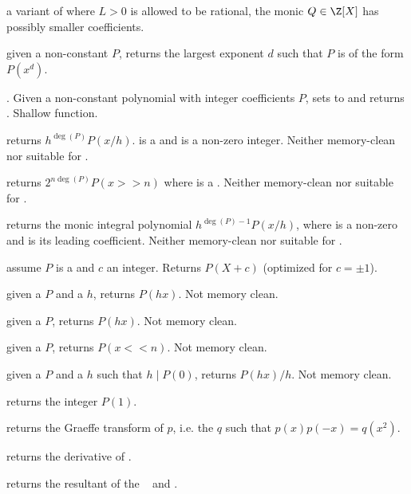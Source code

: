  a variant of 
where $L > 0$ is allowed to be rational, the monic $Q\in \Z[X]$ has possibly
smaller coefficients.

 given a non-constant 
$P$, returns the largest exponent $d$ such that $P$ is of the form $P(x^d)$.

. Given a non-constant
polynomial with integer coefficients $P$, sets  to
 and returns . Shallow
function.

 returns $h^{\deg(P)} P(x/h)$.
 is a  and  is a non-zero integer. Neither memory-clean
nor suitable for .

 returns $2^{n\deg(P)} P(x>>n)$ where
 is a . Neither memory-clean nor suitable for
.

 returns the monic integral polynomial
$h^{\deg(P)-1} P(x/h)$, where  is a non-zero  and  is
its leading coefficient. Neither memory-clean nor suitable for
.

 assume $P$ is a  and $c$ an
integer. Returns $P(X + c)$ (optimized for $c = \pm 1$).

 given a  $P$ and a  $h$,
returns $P(hx)$. Not memory clean.

 given a  $P$,
returns $P(hx)$. Not memory clean.

 given a  $P$, returns
$P(x<<n)$. Not memory clean.

 given a  $P$ and a  $h$
such that $h \mid P(0)$, returns $P(hx)/h$. Not memory clean.

 returns the integer $P(1)$.

 returns the Graeffe transform of $p$, i.e. the
 $q$ such that $p(x)p(-x) = q(x^2)$.

 returns the derivative of .

 returns the resultant of the
~ and .

